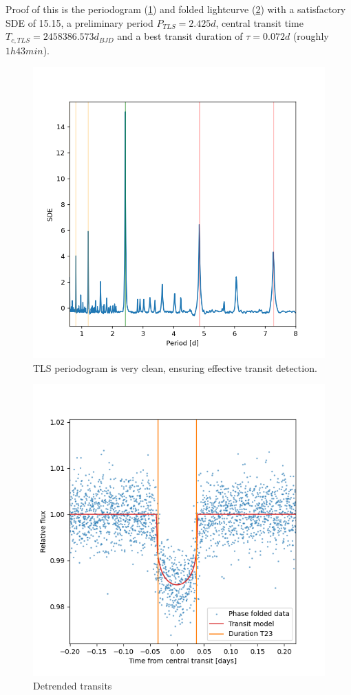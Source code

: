 \documentclass{aa}
\begin{document}
Proof of this is the periodogram (\ref{fig:TLS_periodogram}) and folded lightcurve (\ref{fig:detrended_transits}) with a satisfactory SDE of 15.15, a preliminary period  $P_{TLS}=2.425 d$, central transit time $T_{c,TLS}=2458386.573 d_{BJD}$ and a best transit duration of $\tau=0.072 d$ (roughly $1h43min$).
\begin{figure}[h]
   \centering
    \includegraphics[scale=0.25, angle=0]{pictures/sde.png}
    \caption{TLS periodogram is very clean, ensuring effective transit detection.}
    \label{fig:TLS_periodogram}
\end{figure}
\begin{figure}[h]
  \centering
    \includegraphics[scale=0.35, angle=0]{pictures/transit_zoom.png}
    \caption{Detrended transits}
    \label{fig:detrended_transits}
\end{figure}
\end{document}
